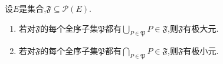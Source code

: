 \begin{corollary}{}{}
	设$E$是集合,$\mathfrak{F}\subseteq\mathcal{P}\left(E\right)$.
	\begin{enumerate}
		\item 若对$\mathfrak{F}$的每个全序子集$\mathfrak{P}$都有$\bigcup\limits_{P\in\mathfrak{P}}P\in\mathfrak{F}$,则$\mathfrak{F}$有极大元.
		\item 若对$\mathfrak{F}$的每个全序子集$\mathfrak{P}$都有$\bigcap\limits_{P\in\mathfrak{P}}P\in\mathfrak{F}$,则$\mathfrak{F}$有极小元.
	\end{enumerate}
\end{corollary}













































